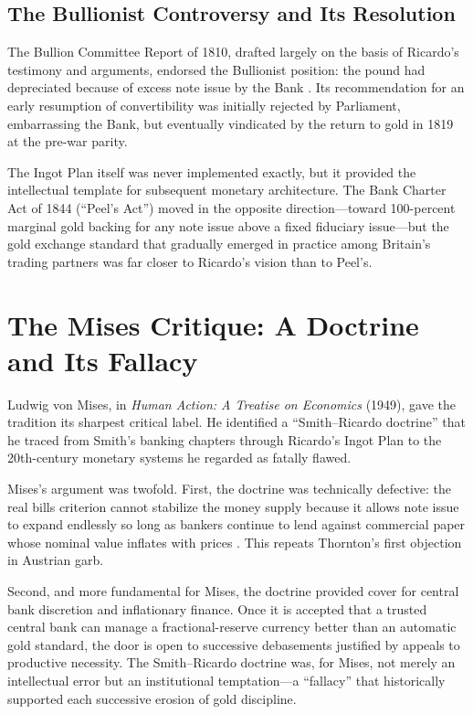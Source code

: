 \documentclass[12pt]{article}
\begin{document}
\subsection{The Bullionist Controversy and Its Resolution}

The Bullion Committee Report of 1810, drafted largely on the
basis of Ricardo's testimony and arguments, endorsed the Bullionist
position: the pound had depreciated because of excess note issue
by the Bank \citep{BullionReport1810}.  Its recommendation for
an early resumption of convertibility was initially rejected by
Parliament, embarrassing the Bank, but eventually vindicated by
the return to gold in 1819 at the pre-war parity.

The Ingot Plan itself was never implemented exactly, but it
provided the intellectual template for subsequent monetary
architecture.  The Bank Charter Act of 1844 (``Peel's Act'')
moved in the opposite direction---toward 100-percent marginal
gold backing for any note issue above a fixed fiduciary
issue---but the gold exchange standard that gradually emerged
in practice among Britain's trading partners was far closer
to Ricardo's vision than to Peel's.

\section{The Mises Critique: A Doctrine and Its Fallacy}
\label{sec:mises}

Ludwig von Mises, in \textit{Human Action: A Treatise on Economics}
(1949), gave the tradition its sharpest critical label.  He
identified a ``Smith--Ricardo doctrine'' that he traced from Smith's
banking chapters through Ricardo's Ingot Plan to the 20th-century
monetary systems he regarded as fatally flawed.

Mises's argument was twofold.  First, the doctrine was technically
defective: the real bills criterion cannot stabilize the money
supply because it allows note issue to expand endlessly so long as
bankers continue to lend against commercial paper whose nominal
value inflates with prices \citep{Mises1949}.  This repeats
Thornton's first objection in Austrian garb.

Second, and more fundamental for Mises, the doctrine provided cover
for central bank discretion and inflationary finance.  Once it is
accepted that a trusted central bank can manage a fractional-reserve
currency better than an automatic gold standard, the door is open
to successive debasements justified by appeals to productive
necessity.  The Smith--Ricardo doctrine was, for Mises, not merely
an intellectual error but an institutional temptation---a
``fallacy'' that historically supported each successive erosion of
gold discipline.
\end{document}
